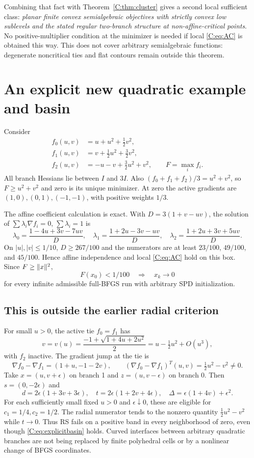 Combining that fact with Theorem~\ref{C:thm:cluster} gives a second local sufficient class: \emph{planar finite convex semialgebraic objectives with strictly convex low sublevels and the stated regular two-branch structure at non-affine-critical points}. No positive-multiplier condition at the minimizer is needed if local \eqref{C:eq:AC} is obtained this way. This does not cover arbitrary semialgebraic functions: degenerate noncritical ties and flat contours remain outside this theorem.


\setcounter{section}{7}
\setcounter{theorem}{7}
\setcounter{equation}{16}
\section{An explicit new quadratic example and basin}
Consider
\begin{align*}
 f_0(u,v)&=u+u^2+\tfrac12v^2,\\
 f_1(u,v)&=v+\tfrac12u^2+\tfrac32v^2,\\
 f_2(u,v)&=-u-v+\tfrac32u^2+v^2,\qquad F=\max_i f_i.
\end{align*}
All branch Hessians lie between $I$ and $3I$. Also $(f_0+f_1+f_2)/3=u^2+v^2$, so $F\ge u^2+v^2$ and zero is its unique minimizer. At zero the active gradients are $(1,0),(0,1),(-1,-1)$, with positive weights $1/3$.

The affine coefficient calculation is exact. With $D=3(1+v-uv)$, the solution of $\sum\lambda_i\nabla f_i=0$, $\sum\lambda_i=1$ is
\[
 \lambda_0=\frac{1-4u+3v-7uv}{D},\quad
 \lambda_1=\frac{1+2u-3v-uv}{D},\quad
 \lambda_2=\frac{1+2u+3v+5uv}{D}.
\]
On $|u|,|v|\le1/10$, $D\ge267/100$ and the numerators are at least $23/100$, $49/100$, and $45/100$. Hence affine independence and local \eqref{C:eq:AC} hold on this box. Since $F\ge\lVert x\rVert^2$,
\begin{equation}\label{C:eq:explicitbasin}
 \boxed{F(x_0)<1/100\quad\Longrightarrow\quad x_k\to0}
\end{equation}
for every infinite admissible full-BFGS run with arbitrary SPD initialization.

\subsection{This is outside the earlier radial criterion}
For small $u>0$, the active tie $f_0=f_1$ has
\[
 v=v(u)=\frac{-1+\sqrt{1+4u+2u^2}}2
 =u-\tfrac12u^2+O(u^3),
\]
with $f_2$ inactive. The gradient jump at the tie is
\[
 \nabla f_0-\nabla f_1=(1+u,-1-2v),\qquad
 (\nabla f_0-\nabla f_1)^T(u,v)=\tfrac12u^2-v^2\ne0.
\]
Take $x=(u,v+\epsilon)$ on branch 1 and $z=(u,v-\epsilon)$ on branch 0. Then $s=(0,-2\epsilon)$ and
\[
 d=2\epsilon(1+3v+3\epsilon),\quad
 t=2\epsilon(1+2v+4\epsilon),\quad
 \Delta=\epsilon(1+4v)+\epsilon^2.
\]
For each sufficiently small fixed $u>0$ and $\epsilon\downarrow0$, these are eligible for $c_1=1/4,c_2=1/2$. The radial numerator tends to the nonzero quantity $\tfrac12u^2-v^2$ while $t\to0$. Thus RS fails on a positive band in every neighborhood of zero, even though \eqref{C:eq:explicitbasin} holds. Curved interfaces between arbitrary quadratic branches are not being replaced by finite polyhedral cells or by a nonlinear change of BFGS coordinates.


